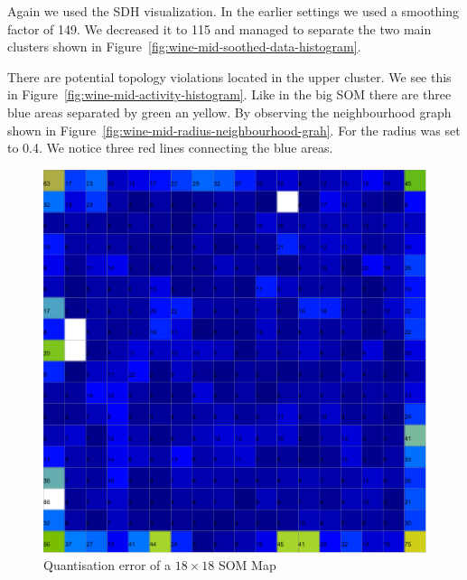\documentclass{acm_proc_article-sp}
\begin{document}
Again we used the SDH visualization. In the earlier settings we used a smoothing factor of 149. We decreased it to
115 and managed to separate the two main clusters shown in Figure~\ref{fig:wine-mid-soothed-data-histogram}.

There are potential topology violations located in the upper cluster. We see this in Figure~\ref{fig:wine-mid-activity-histogram}.
Like in the big SOM there are three blue areas separated by green an yellow. By observing the neighbourhood graph
shown in Figure~\ref{fig:wine-mid-radius-neighbourhood-grah}. For the radius was set to 0.4. We notice three red lines connecting the blue areas.


\begin{figure}
\centering
\includegraphics[width=\linewidth]{img/wine-mid-quant-error}
\caption{Quantisation error of a $18\times18$ SOM Map}
\label{fig:wine-mid-quant-error}
\end{figure}
\end{document}
